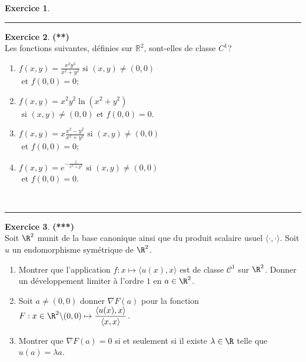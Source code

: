 \documentclass[a4paper,11pt]{article}
\theoremstyle{definition}
\newtheorem{exo}{Exercice} %
\begin{document}
\begin{minipage}{1\linewidth}
\begin{minipage}[t]{0.48\linewidth}
\begin{exo}
			\centering\rule{1\linewidth}{0.6pt}\end{exo}
		
		\begin{exo}\textbf{(**)}\quad\\[0.1cm]
			Les fonctions suivantes, définies sur $\mathbb R^2$, sont-elles de classe $C^1$? \\
			\begin{enumerate}
				\item $\displaystyle f(x,y)=\frac{x^2y^3}{x^2+y^2}\textrm{ si }(x,y)\neq (0,0)$ \\ $\textrm{ et }f(0,0)=0$;\\
				\item $\displaystyle f(x,y)=x^2y^2\ln(x^2+y^2)$ \\ $\textrm{ si }(x,y)\neq (0,0)\textrm{ et }f(0,0)=0$.
				\item $\displaystyle f(x,y)=x\frac{x^2-y^2}{x^2+y^2}\textrm{ si }(x,y)\neq (0,0)$ \\ $\textrm{ et }f(0,0)=0$;
				\item $\displaystyle f(x,y)=e^{-\frac 1{x^2+y^2}}\textrm{ si }(x,y)\neq (0,0)$ \\ $\textrm{ et }f(0,0)=0$.
			\end{enumerate}\quad\\[-0.25cm]
			
			\centering\rule{1\linewidth}{0.6pt}\end{exo}
		
		
	\end{minipage}\hfill\vrule\hfill\begin{minipage}[t]{0.48\linewidth}\raggedright
				\begin{exo}\textbf{(***)}\quad\\[0.1cm]
			Soit  $\R^2$ munit de la base canonique ainsi que du produit scalaire usuel $\langle\cdot,\cdot\rangle$. Soit $u$ un endomorphisme symétrique de $\R^2$. 
			
			\begin{enumerate}
				\item Montrer que l'application $f: x \mapsto \langle u(x),x\rangle$ est de classe $\mathcal C^1$ sur $\R^2$. Donner un développement limiter à l'ordre $1$ en $a\in \R^2$.
				\item Soit $a\neq (0,0)$ donner $\nabla F(a)$ pour la fonction $F: x\in \R^2\backslash(0,0) \mapsto \dfrac{\langle u(x),x\rangle}{\langle x,x\rangle} $.
				\item Montrer que $\nabla F(a) = 0$ si et seulement si il existe $\lambda\in\R$ telle que $u(a) = \lambda a$. 
			\end{enumerate} 
			

\end{exo}
\end{minipage}
\end{minipage}
\end{document}
